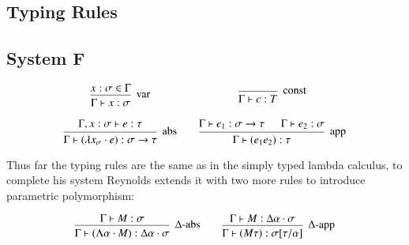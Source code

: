 \begin{appendices}

\section {Typing Rules}

\subsection {System F}
\label{appendix:sysFrules}
\[\begin{array}{c@{\qquad}c}
    \mbox{\begin {prooftree}
      \hypo{x:\sigma \in \Gamma}
      \infer1[var]{\Gamma \vdash x:\sigma}
    \end {prooftree}}
    &
    \mbox{\begin{prooftree}
      \infer0[const]{\Gamma \vdash c:T}
    \end{prooftree}}
    \\\\
    \mbox{\begin{prooftree}
      \hypo{\Gamma, x:\sigma \vdash e : \tau}
      \infer1[abs]{\Gamma \vdash (\lambda x_\sigma \cdot e) : \sigma
        \to \tau}
    \end{prooftree}}
    &
    \mbox{\begin{prooftree}
      \hypo{\Gamma \vdash e_1 : \sigma \to \tau}
      \hypo{\Gamma \vdash e_2 : \sigma}
      \infer2[app]{\Gamma \vdash (e_1 e_2): \tau}
    \end{prooftree}}
    \\
\end{array} \]

Thus far the typing rules are the same as in the simply typed lambda
calculus, to complete his system Reynolds extends it with two more
rules to introduce parametric polymorphism:

\[\begin{array}{c@{\qquad}c}  
    \mbox{\begin{prooftree}
      \hypo{\Gamma \vdash M : \sigma}
      \infer1[$\Delta$-abs]{\Gamma \vdash (\Lambda \alpha \cdot M) : \Delta
      \alpha \cdot \sigma}
    \end{prooftree}}
    &
    \mbox{\begin{prooftree}
      \hypo{\Gamma \vdash M : \Delta \alpha \cdot \sigma}
      \infer1[$\Delta$-app]{\Gamma \vdash (M \tau) : \sigma[\tau / \alpha]}
    \end{prooftree}}
    \\\\
  \end{array} \]


\end{appendices}
